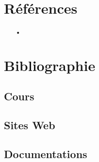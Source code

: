 \documentclass[a4paper]{report}
\begin{document}
\chapter{Références}

\begin{itemize}
	\item[•] %
\end{itemize}

\chapter{Bibliographie}

\section{Cours}
\section{Sites Web}
\section{Documentations}
\end{document}

